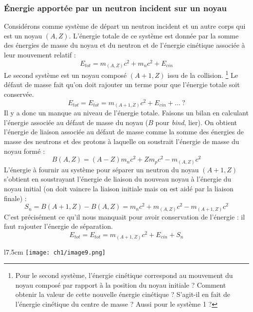 \subsubsection{Énergie apportée par un neutron incident sur un noyau}
Considérons comme système de départ un neutron incident et un autre corps qui est un noyau $(A,Z)$.
L'énergie totale de ce système est donnée par la somme des énergies de masse du noyau et du neutron
et de l'énergie cinétique associée à leur mouvement relatif :
\begin{equation}
E_{tot} = m_{(A,Z)}c^2 + m_nc^2+E_{cin}
\end{equation}
Le second système est un noyau composé $(A+1, Z)$ issu de la collision.
\footnote{Pour le second système, l'énergie cinétique correspond au mouvement du noyau composé
par rapport à la position du noyau initiale ? Comment obtenir la valeur de cette nouvelle énergie cinétique ?
S'agit-il en fait de l'énergie cinétique du centre de masse ? Aussi pour le système 1 ?}
Le défaut de masse fait qu'on doit rajouter un terme pour que l'énergie totale soit conservée.
\begin{equation}
E_{tot}=E_{tot} = m_{(A+1,Z)}c^2 +E_{cin}+\dots\ ? 
\end{equation}
Il y a donc un manque au niveau de l'énergie totale. Faisons un bilan en calculant l'énergie 
associée au défaut de masse du noyau ($B$ pour \textit{bind}, lier).
On obtient l'énergie de liaison associée au défaut de masse comme la somme des énergies de 
masse des neutrons et des protons à laquelle on soustrait l'énergie de masse du noyau formé :
\begin{equation}
B(A,Z) = (A-Z)m_nc^2+Zm_pc^2 - m_{(A,Z)}c^2
\end{equation}
L'énergie à fournir au système pour séparer un neutron du noyau $(A+1,Z)$ s'obtient en soustrayant l'énergie de liaison
du nouveau noyau à l'énergie du noyau initial (on doit vaincre la liaison initiale mais on est aidé par la liaison finale) :
\begin{equation}
S_n = B(A+1,Z)-B(A,Z) = m_nc^2+m_{(A,Z)}c^2-m_{(A+1,Z)}c^2
\end{equation}
C'est précisément ce qu'il nous manquait pour avoir conservation de l'énergie : il faut 
rajouter l'énergie de séparation.
\begin{equation}
E_{tot}=E_{tot} = m_{(A+1,Z)}c^2 +E_{cin}+S_n
\end{equation}

	\begin{wrapfigure}[10]{l}{7.5cm}
	\vspace{-8mm}
	\texttt{[image: ch1/image9.png]}
	\end{wrapfigure}
	
